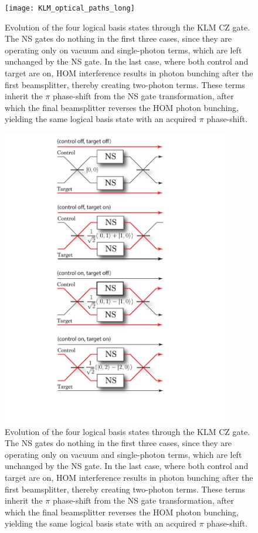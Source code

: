 \pubmode
	\begin{figure}[!htbp]
	\texttt{[image: KLM\_optical\_paths\_long]}
	\captionspacefig \caption{Evolution of the four logical basis states through the KLM CZ gate. The NS gates do nothing in the first three cases, since they are operating only on vacuum and single-photon terms, which are left unchanged by the NS gate. In the last case, where both control and target are on, HOM interference results in photon bunching after the first beamsplitter, thereby creating two-photon terms. These terms inherit the $\pi$ phase-shift from the NS gate transformation, after which the final beamsplitter reverses the HOM photon bunching, yielding the same logical basis state with an acquired $\pi$ phase-shift.} \label{fig:KLM_explain} 
	\end{figure}
\else
	\begin{figure}[!htbp]
	\includegraphics[clip=true, width=0.9\textwidth]{KLM_optical_paths}
	\captionspacefig \caption{Evolution of the four logical basis states through the KLM CZ gate. The NS gates do nothing in the first three cases, since they are operating only on vacuum and single-photon terms, which are left unchanged by the NS gate. In the last case, where both control and target are on, HOM interference results in photon bunching after the first beamsplitter, thereby creating two-photon terms. These terms inherit the $\pi$ phase-shift from the NS gate transformation, after which the final beamsplitter reverses the HOM photon bunching, yielding the same logical basis state with an acquired $\pi$ phase-shift.} \label{fig:KLM_explain} 
	\end{figure}
\fi

